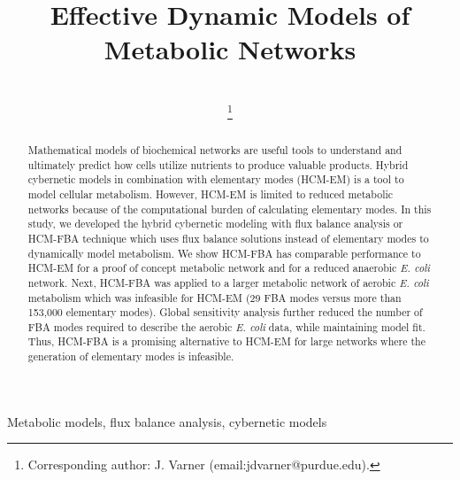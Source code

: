\documentclass[10pt,twocolumn,twoside,final]{IEEEtran}
\begin{document}
\title{Effective Dynamic Models of Metabolic Networks}


\author{\\
\thanks{Corresponding author: J. Varner (email:jdvarner@purdue.edu).}}

\maketitle

\begin{abstract}
Mathematical models of biochemical networks are useful tools to understand and ultimately predict how cells utilize nutrients to produce valuable products.
Hybrid cybernetic models in combination with elementary modes (HCM-EM) is a tool to model cellular metabolism.
However, HCM-EM is limited to reduced metabolic networks because of the computational burden of calculating elementary modes.
In this study, we developed the hybrid cybernetic modeling with flux balance analysis or HCM-FBA technique which uses flux balance solutions instead of elementary modes
to dynamically model metabolism.
We show HCM-FBA has comparable performance to HCM-EM for a proof of concept metabolic network and for a reduced anaerobic \textit{E. coli} network.
Next, HCM-FBA was applied to a larger metabolic network of aerobic \textit{E. coli} metabolism which was infeasible for HCM-EM (29 FBA modes versus more than 153,000 elementary modes).
Global sensitivity analysis further reduced the number of FBA modes required to describe the aerobic \textit{E. coli} data, while maintaining model fit.
Thus, HCM-FBA is a promising alternative to HCM-EM for large networks where the generation of elementary modes is infeasible.

\end{abstract}


\begin{IEEEkeywords}
Metabolic models, flux balance analysis, cybernetic models
\end{IEEEkeywords}
\end{document}
